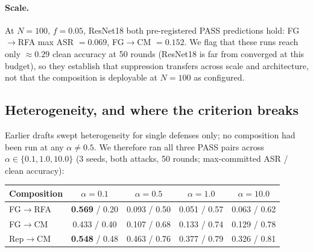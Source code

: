 \documentclass{article}
\begin{document}
\paragraph{Scale.} At $N{=}100$, $f{=}0.05$, ResNet18 both pre-registered PASS predictions hold: FG$\to$RFA max ASR $= 0.069$, FG$\to$CM $= 0.152$. We flag that these runs reach only ${\approx}0.29$ clean accuracy at 50 rounds (ResNet18 is far from converged at this budget), so they establish that suppression transfers across scale and architecture, not that the composition is deployable at $N{=}100$ as configured.

\subsection{Heterogeneity, and where the criterion breaks}
\label{app:alpha_sweep}
Earlier drafts swept heterogeneity for single defenses only; no composition had been run at any $\alpha \neq 0.5$. We therefore ran all three PASS pairs across $\alpha \in \{0.1, 1.0, 10.0\}$ (3 seeds, both attacks, 50 rounds; max-committed ASR / clean accuracy):

\begin{center}\small
\begin{tabular}{lcccc}
\toprule
\textbf{Composition} & $\alpha{=}0.1$ & $\alpha{=}0.5$ & $\alpha{=}1.0$ & $\alpha{=}10.0$ \\
\midrule
FG$\to$RFA & \textbf{0.569} / 0.20 & 0.093 / 0.50 & 0.051 / 0.57 & 0.063 / 0.62 \\
FG$\to$CM & 0.433 / 0.40 & 0.107 / 0.68 & 0.133 / 0.74 & 0.129 / 0.78 \\
Rep$\to$CM & \textbf{0.548} / 0.48 & 0.463 / 0.76 & 0.377 / 0.79 & 0.326 / 0.81 \\
\bottomrule
\end{tabular}
\end{center}
\end{document}
